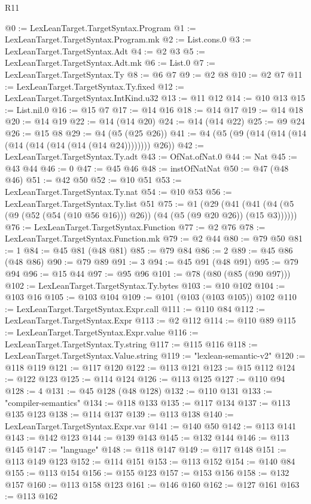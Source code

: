 \begin{lexlean}{R11}
\begin{coremodule}
{{{{{{{{{{{{{{{{{{{{{{{{{{{{{{{{{{{{{{{{{{{{{{{{{{{{{{{{{{{{{{{{{{{{{{{{{{{{{{{{{{{{{{{{{{{{{{{{{{{{{{{{{{@0 := LexLeanTarget.TargetSyntax.Program
@1 := LexLeanTarget.TargetSyntax.Program.mk
@2 := List.cons.{0}
@3 := LexLeanTarget.TargetSyntax.Adt
@4 := @2 @3
@5 := LexLeanTarget.TargetSyntax.Adt.mk
@6 := List.{0}
@7 := LexLeanTarget.TargetSyntax.Ty
@8 := @6 @7
@9 := @2 @8
@10 := @2 @7
@11 := LexLeanTarget.TargetSyntax.Ty.fixed
@12 := LexLeanTarget.TargetSyntax.IntKind.u32
@13 := @11 @12
@14 := @10 @13
@15 := List.nil.{0}
@16 := @15 @7
@17 := @14 @16
@18 := @14 @17
@19 := @14 @18
@20 := @14 @19
@22 := @14 (@14 @20)
@24 := @14 (@14 @22)
@25 := @9 @24
@26 := @15 @8
@29 := @4 (@5 (@25 @26))
@41 := @4 (@5 (@9 (@14 (@14 (@14 (@14 (@14 (@14 (@14 (@14 @24)))))))) @26))
@42 := LexLeanTarget.TargetSyntax.Ty.adt
@43 := OfNat.ofNat.{0}
@44 := Nat
@45 := @43 @44
@46 := 0
@47 := @45 @46
@48 := instOfNatNat
@50 := @47 (@48 @46)
@51 := @42 @50
@52 := @10 @51
@53 := LexLeanTarget.TargetSyntax.Ty.nat
@54 := @10 @53
@56 := LexLeanTarget.TargetSyntax.Ty.list @51
@75 := @1
    (@29 (@41 (@41 (@4 (@5 (@9 (@52 (@54 (@10 @56 @16))) @26)) (@4 (@5 (@9 @20 @26)) (@15 @3))))))
@76 := LexLeanTarget.TargetSyntax.Function
@77 := @2 @76
@78 := LexLeanTarget.TargetSyntax.Function.mk
@79 := @2 @44
@80 := @79 @50
@81 := 1
@84 := @45 @81 (@48 @81)
@85 := @79 @84
@86 := 2
@89 := @45 @86 (@48 @86)
@90 := @79 @89
@91 := 3
@94 := @45 @91 (@48 @91)
@95 := @79 @94
@96 := @15 @44
@97 := @95 @96
@101 := @78 (@80 (@85 (@90 @97)))
@102 := LexLeanTarget.TargetSyntax.Ty.bytes
@103 := @10 @102
@104 := @103 @16
@105 := @103 @104
@109 := @101 (@103 (@103 @105)) @102
@110 := LexLeanTarget.TargetSyntax.Expr.call
@111 := @110 @84
@112 := LexLeanTarget.TargetSyntax.Expr
@113 := @2 @112
@114 := @110 @89
@115 := LexLeanTarget.TargetSyntax.Expr.value
@116 := LexLeanTarget.TargetSyntax.Ty.string
@117 := @115 @116
@118 := LexLeanTarget.TargetSyntax.Value.string
@119 := "lexlean-semantic-v2"
@120 := @118 @119
@121 := @117 @120
@122 := @113 @121
@123 := @15 @112
@124 := @122 @123
@125 := @114 @124
@126 := @113 @125
@127 := @110 @94
@128 := 4
@131 := @45 @128 (@48 @128)
@132 := @110 @131
@133 := "compiler-semantics"
@134 := @118 @133
@135 := @117 @134
@137 := @113 @135 @123
@138 := @114 @137
@139 := @113 @138
@140 := LexLeanTarget.TargetSyntax.Expr.var
@141 := @140 @50
@142 := @113 @141
@143 := @142 @123
@144 := @139 @143
@145 := @132 @144
@146 := @113 @145
@147 := "language"
@148 := @118 @147
@149 := @117 @148
@151 := @113 @149 @123
@152 := @114 @151
@153 := @113 @152
@154 := @140 @84
@155 := @113 @154
@156 := @155 @123
@157 := @153 @156
@158 := @132 @157
@160 := @113 @158 @123
@161 := @146 @160
@162 := @127 @161
@163 := @113 @162
}}}}}}}}}}}}}}}}}}}}}}}}}}}}}}}}}}}}}}}}}}}}}}}}}}}}}}}}}}}}}}}}}}}}}}}}}}}}}}}}}}}}}}}}}}}}}}}}}}}}}}}}}}
\end{coremodule}
\end{lexlean}
